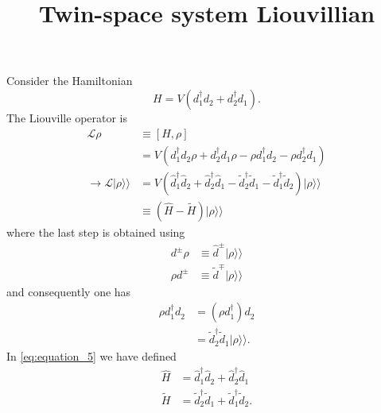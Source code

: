 \documentclass{article}
\newcommand{\pdagger}{{\phantom{\dagger}}}
\begin{document}
\title{Twin-space system Liouvillian}
Consider the Hamiltonian 
\begin{equation}
	H = V(d_1^\dagger d_2^\pdagger + d_2^\dagger d_1^\pdagger).
\end{equation}
The Liouville operator is
\begin{align}
	\mathcal{L} \rho &\equiv [H,\rho]\\
	&=V(d_1^\dagger d_2^\pdagger\rho + d_2^\dagger d_1^\pdagger \rho - \rho d_1^\dagger d_2^\pdagger - \rho d_2^\dagger d_1^\pdagger)\\
	\rightarrow \mathcal{L}\vert \rho\rangle\!\rangle &= V(\hat{d}_1^\dagger \hat{d}_2^\pdagger + \hat{d}_2^\dagger \hat{d}_1^\pdagger - \tilde{d}_2^\dagger \tilde{d}_1^\pdagger - \tilde{d}_1^\dagger \tilde{d}_2^\pdagger)\vert \rho\rangle\!\rangle \\
	&\equiv (\hat{H}-\tilde{H})\vert \rho\rangle\!\rangle\label{eq:equation_5}
\end{align}
where the last step is obtained using
\begin{align*}
	d^\pm \rho &\equiv \hat{d}^\pm \vert \rho\rangle\!\rangle\\
	\rho  d^\pm &\equiv \tilde{d}^\mp \vert \rho\rangle\!\rangle
\end{align*}
and consequently one has
\begin{align}
	\rho d_1^\dagger d_2^\pdagger &= (\rho d_1^\dagger) d_2^\pdagger \\
	&= \tilde{d}_2^\dagger \tilde{d}_1^\pdagger \vert \rho\rangle\!\rangle.
\end{align}
In \cref{eq:equation_5} we have defined
\begin{align*}
	\hat{H}&=\hat{d}_1^\dagger \hat{d}_2^\pdagger + \hat{d}_2^\dagger \hat{d}_1^\pdagger\\
	\tilde{H}&=\tilde{d}_2^\dagger \tilde{d}_1^\pdagger + \tilde{d}_1^\dagger \tilde{d}_2^\pdagger.
\end{align*}
\maketitle
\printbibliography
\end{document}
